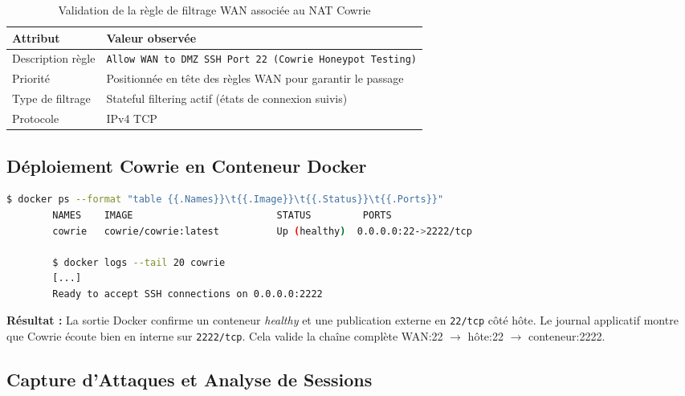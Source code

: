 \documentclass[12pt,a4paper,openany]{report}
\newcommand{\tableheadcolor}{\rowcolor{tableheadbg}}
\begin{document}
	\begin{table}[H]
		\centering
		\renewcommand{\arraystretch}{1.35}
		\setlength{\arrayrulewidth}{0.5pt}
		\begin{tabular}{p{3.1cm} p{7.2cm}}
			\arrayrulecolor{tableborder}
			\hline
			\tableheadcolor
			\textcolor{tableheadfg}{\textbf{Attribut}} &
			\textcolor{tableheadfg}{\textbf{Valeur observée}} \\
			\hline
			\rowcolor{tablerowalt}
			Description règle & \texttt{Allow WAN to DMZ SSH Port 22 (Cowrie Honeypot Testing)} \\
			Priorité & Positionnée en tête des règles WAN pour garantir le passage \\
			\rowcolor{tablerowalt}
			Type de filtrage & Stateful filtering actif (états de connexion suivis) \\
			Protocole & IPv4 TCP \\
			\hline
		\end{tabular}
		\caption{Validation de la règle de filtrage WAN associée au NAT Cowrie}
		\label{tab:cowrie-firewall-rule}
	\end{table}
	
	\subsection{Déploiement Cowrie en Conteneur Docker}
	
	\begin{lstlisting}[language=bash, caption={Vérification du service Cowrie dans Docker}]
		$ docker ps --format "table {{.Names}}\t{{.Image}}\t{{.Status}}\t{{.Ports}}"
		NAMES    IMAGE                         STATUS         PORTS
		cowrie   cowrie/cowrie:latest          Up (healthy)  0.0.0.0:22->2222/tcp
		
		$ docker logs --tail 20 cowrie
		[...]
		Ready to accept SSH connections on 0.0.0.0:2222
	\end{lstlisting}
	
	\textbf{Résultat :} La sortie Docker confirme un conteneur \textit{healthy} et une publication externe en \texttt{22/tcp} côté hôte. Le journal applicatif montre que Cowrie écoute bien en interne sur \texttt{2222/tcp}. Cela valide la chaîne complète WAN:22 $\rightarrow$ hôte:22 $\rightarrow$ conteneur:2222.
	
	\subsection{Capture d'Attaques et Analyse de Sessions}
	
\end{document}
